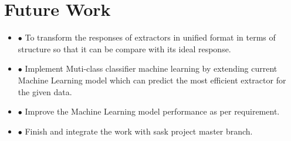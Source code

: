 \documentclass{llncs}
\begin{document}
\section{Future Work}
\begin {itemize}
\item[$\bullet$ ] To transform the responses of extractors in unified format  in terms of structure so that it can be compare with its ideal response. 
\item[$\bullet$ ] Implement Muti-class classifier machine learning by extending current Machine Learning model which can predict the most efficient extractor for the given data. 
\item[$\bullet$ ] Improve the Machine Learning model performance as per requirement. 
\item[$\bullet$ ]Finish and integrate the work with sask project master branch.




\end{itemize}
\clearpage
\end{document}
